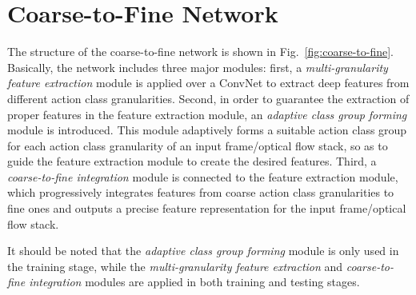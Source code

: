 \documentclass[letterpaper]{article} %
\begin{document}



\section{Coarse-to-Fine Network\label{section:Coarse-to-fine}}



The structure of the coarse-to-fine network is shown in Fig.~\ref{fig:coarse-to-fine}. Basically, the network includes three major modules: first, a \emph{multi-granularity feature extraction} module is applied over a ConvNet to extract deep features from different action class granularities. Second, in order to guarantee the extraction of proper features in the feature extraction module, an \emph{adaptive class group forming} module is introduced. This module adaptively forms a suitable action class group for each action class granularity of an input frame/optical flow stack, so as to guide the feature extraction module to create the desired features. Third, a \emph{coarse-to-fine integration} module is connected to the feature extraction module, which progressively integrates features from coarse action class granularities to fine ones and outputs a precise feature representation for the input frame/optical flow stack.

It should be noted that the \emph{adaptive class group forming} module is only used in the training stage, while the \emph{multi-granularity feature extraction} and \emph{coarse-to-fine integration} modules are applied in both training and testing stages.


\end{document}
